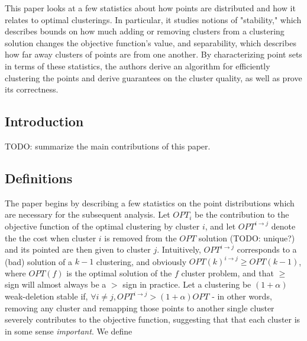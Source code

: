 \documentclass[paper=a4, fontsize=11pt]{scrartcl} %
\numberwithin{equation}{section} %
\numberwithin{figure}{section} %
\numberwithin{table}{section} %
\begin{document}
This paper looks at a few statistics about how points are distributed and how it relates to optimal clusterings.  In particular, it studies notions of "stability," which describes bounds on how much adding or removing clusters from a clustering solution changes the objective function's value, and separability, which describes how far away clusters of points are from one another.  By characterizing point sets in terms of these statistics, the authors derive an algorithm for efficiently clustering the points and derive guarantees on the cluster quality, as well as prove its correctness.

\subsection{Introduction}
TODO: summarize the main contributions of this paper.

\subsection{Definitions}
The paper begins by describing a few statistics on the point distributions which are necessary for the subsequent analysis.  Let $OPT_i$ be the contribution to the objective function of the optimal clustering by cluster $i$, and let $OPT^{i \rightarrow j}$ denote the the cost when cluster $i$ is removed from the $OPT$ solution (TODO: unique?) and its pointed are then given to cluster $j$.  Intuitively, $OPT^{i \rightarrow j}$ corresponds to a (bad) solution of a $k-1$ clustering, and obviously $OPT(k)^{i \rightarrow j} \geq OPT(k-1)$, where $OPT(f)$ is the optimal solution of the $f$ cluster problem, and that $\geq$ sign will almost always be a $>$ sign in practice.  Let a clustering be $(1 + \alpha)$ weak-deletion stable if, $\forall i \neq j, OPT^{i \rightarrow j} > (1 + \alpha)OPT$ - in other words, removing any cluster and remapping those points to another single cluster severely contributes to the objective function, suggesting that that each cluster is in some sense \emph{important}.  We define 
\end{document}
